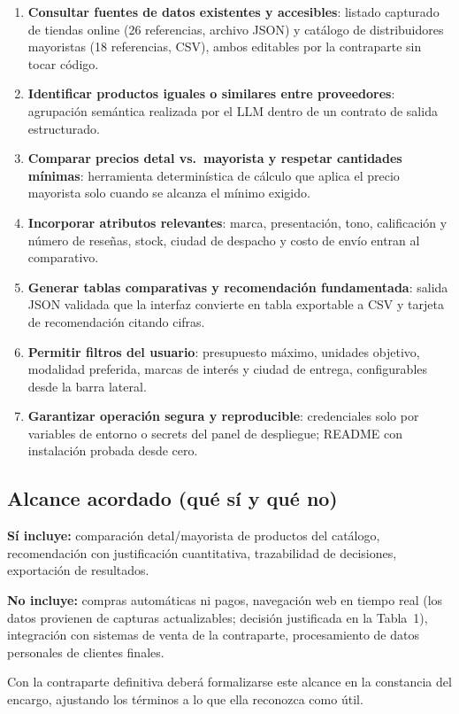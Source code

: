 \documentclass[11pt,letterpaper]{article}
\begin{document}
\begin{enumerate}[leftmargin=*,itemsep=2pt]
\item \textbf{Consultar fuentes de datos existentes y accesibles}: listado capturado de tiendas online
(26 referencias, archivo JSON) y catálogo de distribuidores mayoristas (18 referencias, CSV), ambos
editables por la contraparte sin tocar código.
\item \textbf{Identificar productos iguales o similares entre proveedores}: agrupación semántica
realizada por el LLM dentro de un contrato de salida estructurado.
\item \textbf{Comparar precios detal vs.\ mayorista y respetar cantidades mínimas}: herramienta
determinística de cálculo que aplica el precio mayorista solo cuando se alcanza el mínimo exigido.
\item \textbf{Incorporar atributos relevantes}: marca, presentación, tono, calificación y número de
reseñas, stock, ciudad de despacho y costo de envío entran al comparativo.
\item \textbf{Generar tablas comparativas y recomendación fundamentada}: salida JSON validada que
la interfaz convierte en tabla exportable a CSV y tarjeta de recomendación citando cifras.
\item \textbf{Permitir filtros del usuario}: presupuesto máximo, unidades objetivo, modalidad
preferida, marcas de interés y ciudad de entrega, configurables desde la barra lateral.
\item \textbf{Garantizar operación segura y reproducible}: credenciales solo por variables de entorno
o secrets del panel de despliegue; README con instalación probada desde cero.
\end{enumerate}

\subsection*{Alcance acordado (qué sí y qué no)}

\textbf{Sí incluye:} comparación detal/mayorista de productos del catálogo, recomendación con
justificación cuantitativa, trazabilidad de decisiones, exportación de resultados.

\textbf{No incluye:} compras automáticas ni pagos, navegación web en tiempo real (los datos provienen
de capturas actualizables; decisión justificada en la Tabla~1), integración con sistemas de venta de
la contraparte, procesamiento de datos personales de clientes finales.

Con la contraparte definitiva deberá formalizarse este alcance en la constancia del encargo,
ajustando los términos a lo que ella reconozca como útil.
\end{document}
